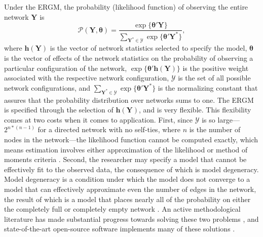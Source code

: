 \documentclass[fleqn,12pt]{wlscirep}
\newcommand{\bt}{\pmb{\theta}}
\newcommand{\bh}{\bm{h}}
\begin{document}
Under the ERGM, the probability (likelihood function) of observing the entire network $\bm{Y}$ is 
$$ \mathcal{P}(\bm{Y}, \bt) = \frac{\exp \{ \bt' \bm{Y}  \}}{\sum_{\bm{Y}^* \in \mathcal{Y}} \exp \{\bt ' \bm{Y}^*  \}},$$
where $ \bh(\bm{Y})$ is the vector of network statistics selected to specify the model, $\bt$ is the vector of effects of the network statistics on the probability of observing a particular configuration of the network, $\exp \{\bt' \bh(\bm{Y}) \}$ is the positive weight associated with the respective network configuration, $\mathcal{Y}$ is the set of all possible network configurations, and $ \sum_{\bm{Y}^* \in \mathcal{Y}} \exp \{\bt ' \bm{Y}^*  \} $ is the normalizing constant that assures that the probability distribution over networks sums to one. The ERGM is specified through the selection of $ \bh(\bm{Y})$, and is very flexible. This flexibility comes at two costs when it comes to application. First, since $\mathcal{Y}$ is so large---$2^{n*(n-1)}$ for a directed network with no self-ties, where $n$ is the number of nodes in the network---the likelihood function cannot be computed exactly, which means estimation involves either approximation of the likelihood or method of moments criteria \citep{hummel2012improving,schmid2017exponential,he2016estimating}.  Second, the researcher may specify a model that cannot be effectively fit to the observed data, the consequence of which is model degeneracy. Model degeneracy is a condition under which the model does not converge to a model that can effectively approximate even the number of edges in the network, the result of which is a model that places nearly all of the probability on either the completely full or completely empty network \citep{schweinberger2011instability}.  An active methodological literature has made substantial progress towards solving these two problems \citep[e.g., ][]{demuse2018phase}, and state-of-the-art open-source software implements many of these solutions \citep{hunter2008ergm}. 
\end{document}
